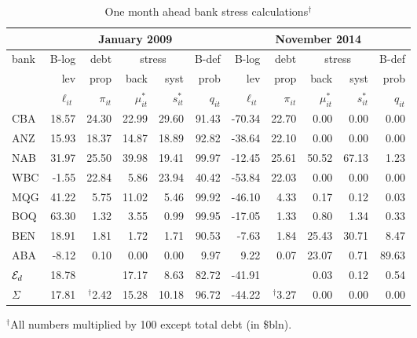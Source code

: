 \documentclass[12pt]{article}
\newcommand{\Ex}{{\cal E}}
\begin{document}
 \begin{table}[ht]
\caption{One month ahead bank stress calculations$^\dag$}\label{twodates}
\centering
\small
\vspace{4mm}
\begin{tabular}{l|rrrrr|rrrrr}
\hline
&\multicolumn{5}{c|}{January 2009}&\multicolumn{5}{c}{November 2014}\\
  \hline
bank & B-log& debt &\multicolumn{2}{c}{stress}&  B-def   & B-log& debt   & \multicolumn{2}{c}{stress}& B-def \\
  \cline{4-5}\cline{9-10}
       &  lev& prop    & back & syst & prob & lev& prop  & back & syst & prob \\
  \cline{2-11} 
         & $\ell_{it} $ & $\pi_{it}$ & $\mu^*_{it}$  & $s^*_{it}$ & $q_{it}$  
         & $\ell_{it} $ & $\pi_{it}$ & $\mu^*_{it}$  & $s^*_{it}$ & $q_{it}$  
        \\
  \hline
CBA & 18.57 & 24.30 & 22.99 & 29.60 & 91.43 & -70.34 & 22.70 & 0.00 & 0.00 & 0.00 \\ 
  ANZ & 15.93 & 18.37 & 14.87 & 18.89 & 92.82 & -38.64 & 22.10 & 0.00 & 0.00 & 0.00 \\ 
  NAB & 31.97 & 25.50 & 39.98 & 19.41 & 99.97 & -12.45 & 25.61 & 50.52 & 67.13 & 1.23 \\ 
  WBC & -1.55 & 22.84 & 5.86 & 23.94 & 40.42 & -53.84 & 22.03 & 0.00 & 0.00 & 0.00 \\ 
  MQG & 41.22 & 5.75 & 11.02 & 5.46 & 99.92 & -46.10 & 4.33 & 0.17 & 0.12 & 0.03 \\ 
  BOQ & 63.30 & 1.32 & 3.55 & 0.99 & 99.95 & -17.05 & 1.33 & 0.80 & 1.34 & 0.33 \\ 
  BEN & 18.91 & 1.81 & 1.72 & 1.71 & 90.53 & -7.63 & 1.84 & 25.43 & 30.71 & 8.47 \\ 
  ABA& -8.12 & 0.10 & 0.00 & 0.00 & 9.97 & 9.22 & 0.07 & 23.07 & 0.71 & 89.63 \\ 
  \hline
  $\Ex_d$ & 18.78 &  & 17.17 & 8.63 & 82.72 & -41.91 &  & 0.03 & 0.12 & 0.54 \\ 
  $\Sigma$ & 17.81 & $^\dag$2.42 & 15.28 & 10.18 & 96.72 & -44.22 & $^\dag$3.27 & 0.00 & 0.00 & 0.00 \\ 
\hline
\end{tabular}

$^\dag$All numbers multiplied by 100 except total debt (in \$bln).
\end{table}
\normalsize
\end{document}
